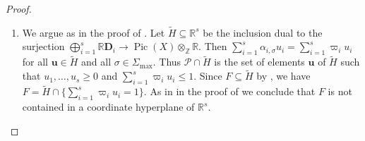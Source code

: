 \documentclass[10pt, a4paper, reqno, english]{amsart}
\newcommand\ZZ{\mathbb{Z}}
\newcommand\RR{\mathbb{R}}
\newcommand{\divclass}{{\mathbf D}} %
\DeclareMathOperator{\pic}{Pic} %
\theoremstyle{definition}
\numberwithin{theorem}{section}
\numberwithin{equation}{section}
\begin{document}
\begin{proof}
\begin{enumerate}[label=(\roman*), ref=(\roman*)]
\item We argue as in the proof of \cite[Lemma 6.7(ii)]{hypmethod}. Let $\widetilde H\subseteq \RR^s$ be the inclusion dual to the surjection $\bigoplus_{i=1}^s\RR\divclass_i\to\pic(X)\otimes_{\ZZ}\RR$. Then $\sum_{i=1}^s\alpha_{i,\sigma}u_i=\sum_{i=1}^s\varpi_iu_i$ for all $\mathbf u\in \widetilde H$ and all $\sigma\in\Sigma_{\max}$. Thus $\mathcal P\cap\widetilde H$ is the set of elements $\mathbf u$ of $\widetilde H$ such that $u_1,\dots,u_s\geq 0$ and $\sum_{i=1}^s\varpi_iu_i\leq 1$. Since $F\subseteq\widetilde H$ by \cite[Lemma 6.7(i)]{hypmethod}, we have $F=\widetilde H\cap\{\sum_{i=1}^s\varpi_iu_i= 1\}$. As in in the proof of \cite[Lemma 6.7(ii)]{hypmethod} we conclude that $F$ is not contained in a coordinate hyperplane of $\RR^s$.
\end{enumerate}
\end{proof}
\end{document}
